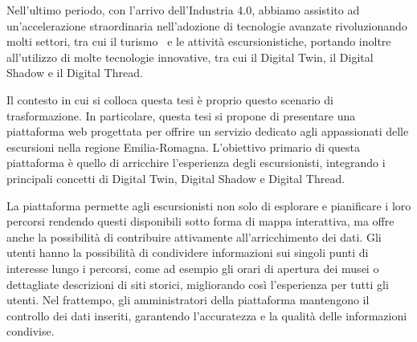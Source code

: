     




Nell’ultimo periodo, con l’arrivo dell’Industria 4.0, abbiamo assistito ad un’accelerazione straordinaria nell’adozione di tecnologie avanzate rivoluzionando molti settori, tra cui il turismo~\cite{Turismo} e le attività escursionistiche, portando inoltre all’utilizzo di molte tecnologie innovative, tra cui il Digital Twin, il Digital Shadow e il Digital Thread.

Il contesto in cui si colloca questa tesi è proprio questo scenario di trasformazione. In particolare, questa tesi si propone di presentare una piattaforma web progettata per offrire un servizio dedicato agli appassionati delle escursioni nella regione Emilia-Romagna. L'obiettivo primario di questa piattaforma è quello di arricchire l'esperienza degli escursionisti, integrando i principali concetti di Digital Twin, Digital Shadow e Digital Thread.

La piattaforma permette agli escursionisti non solo di esplorare e pianificare i loro percorsi rendendo questi disponibili sotto forma di mappa interattiva, ma offre anche la possibilità di contribuire attivamente all'arricchimento dei dati. Gli utenti hanno la possibilità di condividere informazioni sui singoli punti di interesse lungo i percorsi, come ad esempio gli orari di apertura dei musei o dettagliate descrizioni di siti storici, migliorando così l'esperienza per tutti gli utenti. Nel frattempo, gli amministratori della piattaforma mantengono il controllo dei dati inseriti, garantendo l'accuratezza e la qualità delle informazioni condivise.


